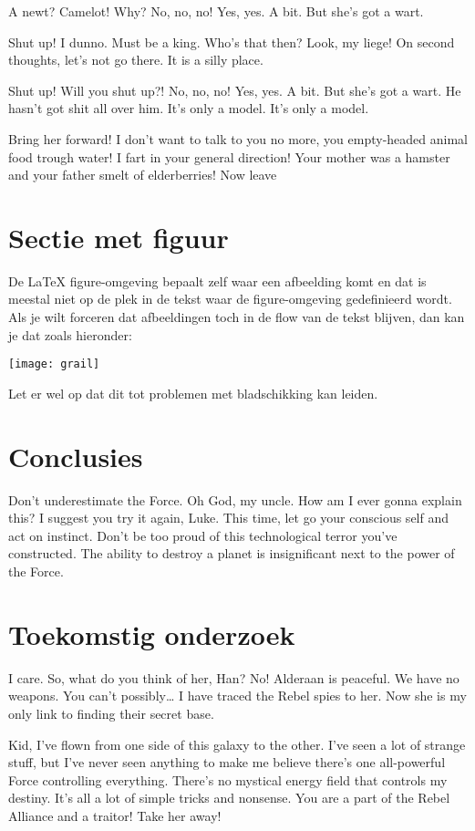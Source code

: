 \documentclass[a0,portrait]{hogent-poster}
\begin{document}
\begin{multicols}{2}
A newt? Camelot! Why? No, no, no! Yes, yes. A bit. But she's got a wart.

Shut up! I dunno. Must be a king. Who's that then? Look, my liege! On second thoughts, let's not go there. It is a silly place.

Shut up! Will you shut up?! No, no, no! Yes, yes. A bit. But she's got a wart. He hasn't got shit all over him. It's only a model. It's only a model.

Bring her forward! I don't want to talk to you no more, you empty-headed animal food trough water! I fart in your general direction! Your mother was a hamster and your father smelt of elderberries! Now leave 

\section{Sectie met figuur}

De {\LaTeX} figure-omgeving bepaalt zelf waar een afbeelding komt en dat is meestal niet op de plek in de tekst waar de figure-omgeving gedefinieerd wordt. Als je wilt forceren dat afbeeldingen toch in de flow van de tekst blijven, dan kan je dat zoals hieronder:

\begin{center}
  \captionsetup{type=figure}
  \texttt{[image: grail]}
\end{center}

Let er wel op dat dit tot problemen met bladschikking kan leiden.

\section{Conclusies}

Don't underestimate the Force. Oh God, my uncle. How am I ever gonna explain this? I suggest you try it again, Luke. This time, let go your conscious self and act on instinct. Don't be too proud of this technological terror you've constructed. The ability to destroy a planet is insignificant next to the power of the Force.

\section{Toekomstig onderzoek}

I care. So, what do you think of her, Han? No! Alderaan is peaceful. We have no weapons. You can't possibly… I have traced the Rebel spies to her. Now she is my only link to finding their secret base.

Kid, I've flown from one side of this galaxy to the other. I've seen a lot of strange stuff, but I've never seen anything to make me believe there's one all-powerful Force controlling everything. There's no mystical energy field that controls my destiny. It's all a lot of simple tricks and nonsense. You are a part of the Rebel Alliance and a traitor! Take her away! 

\end{multicols}
\end{document}
